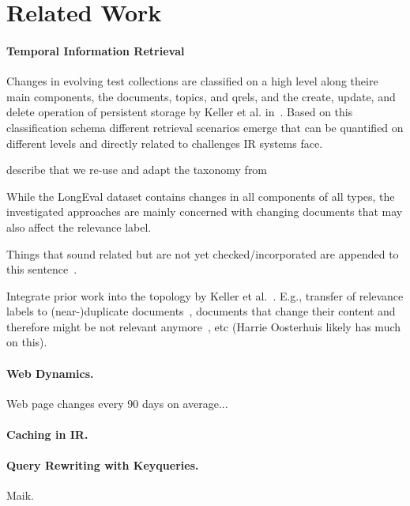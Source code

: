 \section{Related Work}

\paragraph{Temporal Information Retrieval}

Changes in evolving test collections are classified on a high level along theire main components, the documents, topics, and qrels, and the create, update, and delete operation of persistent storage by Keller et al. in~\cite{keller:2024}. Based on this classification schema different retrieval scenarios emerge that can be quantified on different levels and directly related to challenges IR systems face.

{\color{red} describe that we re-use and adapt the taxonomy from~\cite{keller:2024}}

While the LongEval dataset contains changes in all components of all types, the investigated approaches are mainly concerned with changing documents that may also affect the relevance label.



Things that sound related but are not yet checked/incorporated are appended to this sentence~\cite{li:2022}.

Integrate prior work into the topology by Keller et al.~\cite{keller:2024}. E.g., transfer of relevance labels to (near-)duplicate documents~\cite{froebe:2021a}, documents that change their content and therefore might be not relevant anymore~\cite{froebe:2022d}, etc (Harrie Oosterhuis likely has much on this).



\paragraph{Web Dynamics.} Web page changes every 90 days on average...

\paragraph{Caching in IR.}


\paragraph{Query Rewriting with Keyqueries.} {\color{red} Maik.}

